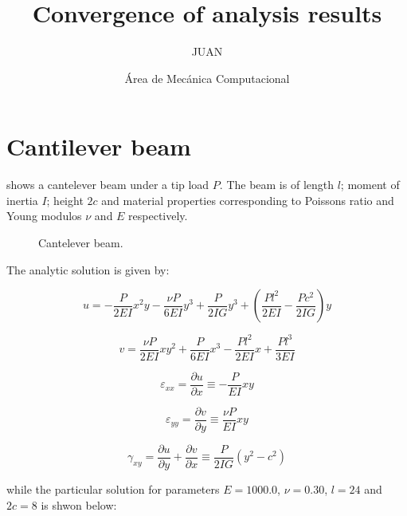 \documentclass[12pt,letterpaper]{article}
\author{JUAN}
\author{Área de Mecánica Computacional}
\title{\textbf{Convergence of analysis results}}
\begin{document}
\maketitle
\section{Cantilever beam}
 shows a cantelever beam under a tip load $P$. The beam is of length $l$; moment of inertia $I$; height $2c$ and material properties corresponding to Poissons ratio and Young modulos $\nu$ and $E$ respectively.

\begin{figure}[H]
\centering
{}
\caption{Cantelever beam.}
\label{fig:viga}
\end{figure}

The analytic solution \citep{book:timoshenko} is given by:

\[u =  - \frac{P}{{2EI}}{x^2}y - \frac{{\nu P}}{{6EI}}{y^3} + \frac{P}{{2IG}}{y^3} + \left( {\frac{{P{l^2}}}{{2EI}} - \frac{{P{c^2}}}{{2IG}}} \right)y\]

\[v = \frac{{\nu P}}{{2EI}}x{y^2} + \frac{P}{{6EI}}{x^3} - \frac{{P{l^2}}}{{2EI}}x + \frac{{P{l^3}}}{{3EI}}\]

\[{\varepsilon _{xx}} = \frac{{\partial u}}{{\partial x}} \equiv  - \frac{P}{{EI}}xy\]

\[{\varepsilon _{yy}} = \frac{{\partial v}}{{\partial y}} \equiv \frac{{\nu P}}{{EI}}xy\]

\[{\gamma _{xy}} = \frac{{\partial u}}{{\partial y}} + \frac{{\partial v}}{{\partial x}} \equiv \frac{P}{{2IG}}\left( {{y^2} - {c^2}} \right)\]

while the particular solution for parameters $E=1000.0$, $\nu=0.30$, $l=24$ and $2c=8$ is shwon below:
\end{document}
